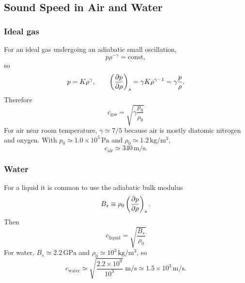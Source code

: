 \documentclass[../main.tex]{subfiles}
\begin{document}
\subsection{Sound Speed in Air and Water}\label{sec:lec22:sound-speed}

\subsubsection*{Ideal gas}
For an ideal gas undergoing an adiabatic small oscillation,
\[
  p\rho^{-\gamma}=\mathrm{const},
\]
so
\[
  p=K\rho^\gamma,\qquad
  \left(\pdv{p}{\rho}\right)_s=\gamma K\rho^{\gamma-1}
  =\gamma\frac{p}{\rho}.
\]
Therefore
\begin{equation}
  \boxed{\;c_{\mathrm{gas}}=\sqrt{\gamma\frac{p_0}{\rho_0}}\;}
  \label{eq:lec22_ideal_gas_sound}
\end{equation}
For air near room temperature, $\gamma\simeq7/5$ because air is mostly diatomic
nitrogen and oxygen. With $p_0\simeq1.0\times10^5\,\mathrm{Pa}$ and
$\rho_0\simeq1.2\,\mathrm{kg/m^3}$,
\begin{equation}
  c_{\mathrm{air}}\simeq 340\,\mathrm{m/s}.
  \label{eq:lec22_air_number}
\end{equation}


\subsubsection*{Water}
For a liquid it is common to use the adiabatic bulk modulus
\begin{equation}
  B_s\equiv \rho_0\left(\pdv{p}{\rho}\right)_s.
  \label{eq:lec22_bulk_modulus}
\end{equation}
Then
\begin{equation}
  \boxed{\;c_{\mathrm{liquid}}=\sqrt{\frac{B_s}{\rho_0}}\;}
  \label{eq:lec22_liquid_sound}
\end{equation}
For water, $B_s\simeq2.2\,\mathrm{GPa}$ and
$\rho_0\simeq10^3\,\mathrm{kg/m^3}$, so
\begin{equation}
  c_{\mathrm{water}}\simeq
  \sqrt{\frac{2.2\times10^9}{10^3}}\;\mathrm{m/s}
  \simeq1.5\times10^3\,\mathrm{m/s}.
  \label{eq:lec22_water_number}
\end{equation}
\end{document}
